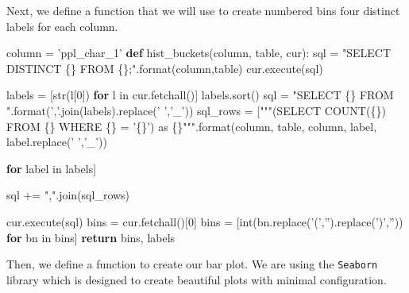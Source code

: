 \documentclass[]{report}
\newenvironment{Shaded}{}{}
\newcommand{\KeywordTok}[1]{\textcolor[rgb]{0.00,0.44,0.13}{\textbf{{#1}}}}
\newcommand{\DataTypeTok}[1]{\textcolor[rgb]{0.56,0.13,0.00}{{#1}}}
\newcommand{\DecValTok}[1]{\textcolor[rgb]{0.25,0.63,0.44}{{#1}}}
\newcommand{\StringTok}[1]{\textcolor[rgb]{0.25,0.44,0.63}{{#1}}}
\newcommand{\NormalTok}[1]{{#1}}
\begin{document}
Next, we define a function that we will use to create numbered bins four
distinct labels for each column.

\begin{Shaded}
\begin{Highlighting}[]
\NormalTok{column = }\StringTok{'ppl_char_1'}
\KeywordTok{def} \NormalTok{hist_buckets(column, table, cur):}
    \NormalTok{sql = }\StringTok{"SELECT DISTINCT \{\} FROM \{\};"}\NormalTok{.}\DataTypeTok{format}\NormalTok{(column,table)}
    \NormalTok{cur.execute(sql)}

    \NormalTok{labels = [}\DataTypeTok{str}\NormalTok{(l[}\DecValTok{0}\NormalTok{]) }\KeywordTok{for} \NormalTok{l in cur.fetchall()]}
    \NormalTok{labels.sort()}
    \NormalTok{sql = }\StringTok{"SELECT \{\} FROM "}\NormalTok{.}\DataTypeTok{format}\NormalTok{(}\StringTok{','}\NormalTok{.join(labels).replace(}\StringTok{' '}\NormalTok{,}\StringTok{'_'}\NormalTok{))}
    \NormalTok{sql_rows = [}\StringTok{"""(SELECT COUNT(\{\}) }
\StringTok{                    FROM \{\} }
\StringTok{                    WHERE \{\} = '\{\}') as \{\}"""}\NormalTok{.}\DataTypeTok{format}\NormalTok{(column,}
                                                     \NormalTok{table,}
                                                     \NormalTok{column,}
                                                     \NormalTok{label,}
                                                     \NormalTok{label.replace(}\StringTok{' '}\NormalTok{,}\StringTok{'_'}\NormalTok{)) }
                                                     
                                                     \KeywordTok{for} \NormalTok{label in labels]}

    \NormalTok{sql += }\StringTok{","}\NormalTok{.join(sql_rows)}
    
    \NormalTok{cur.execute(sql)}
    \NormalTok{bins = cur.fetchall()[}\DecValTok{0}\NormalTok{]}
    \NormalTok{bins = [}\DataTypeTok{int}\NormalTok{(bn.replace(}\StringTok{'('}\NormalTok{,}\StringTok{''}\NormalTok{).replace(}\StringTok{')'}\NormalTok{,}\StringTok{''}\NormalTok{)) }\KeywordTok{for} \NormalTok{bn in bins]}
    \KeywordTok{return} \NormalTok{bins, labels}

\end{Highlighting}
\end{Shaded}

Then, we define a function to create our bar plot. We are using the
\texttt{Seaborn} library which is designed to create beautiful plots
with minimal configuration.
\end{document}
